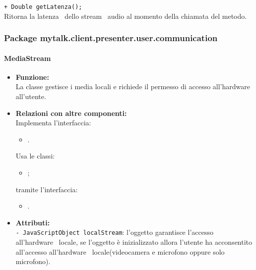 {{\begin{sloppypar}
{{{\begin{itemize}
					\texttt{+ Double getLatenza();}\\
					Ritorna la latenza\g~ dello stream\g~ audio al momento della chiamata del metodo.\\
			\end{itemize}
			}
	}
	
	\subsubsection{Package mytalk.client.presenter.user.communication}{
	
			\paragraph{MediaStream}\label{par:MediaStream}{
			\begin{itemize}
				\item[] \textbf{Funzione:}\\
					La classe gestisce i media locali e richiede il permesso di accesso all'hardware\g~ all'utente.\\
			
				\item[] \textbf{Relazioni con altre componenti:}\\
					Implementa l'interfaccia: 
					\begin{itemize}
						\item[] .
					\end{itemize}
					Usa le classi:
					\begin{itemize}
						\item[] ;
					\end{itemize}
					tramite l'interfaccia:
					\begin{itemize}
						\item[].\\
					\end{itemize}
		
				\item[] \textbf{Attributi:}{\\
					\texttt{- JavaScriptObject localStream}: l'oggetto garantisce l'accesso all'hardware\g~ locale, se l'oggetto è inizializzato allora l'utente ha acconsentito all'accesso all'hardware\g~ locale(videocamera e microfono oppure solo microfono).\\

}
\end{itemize}}}}
\end{sloppypar}}}
